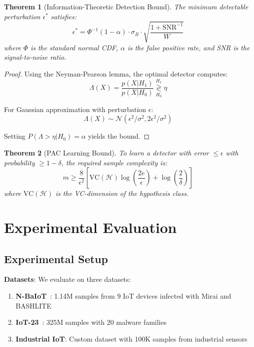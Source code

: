 \documentclass[10pt,conference]{IEEEtran}
\newtheorem{theorem}{Theorem}
\begin{document}
\begin{theorem}[Information-Theoretic Detection Bound]
\label{thm:info_bound}
The minimum detectable perturbation $\epsilon^*$ satisfies:
\begin{equation}
\epsilon^* = \Phi^{-1}(1-\alpha) \cdot \sigma_B \cdot \sqrt{\frac{1 + \text{SNR}^{-1}}{W}}
\end{equation}
where $\Phi$ is the standard normal CDF, $\alpha$ is the false positive rate, and SNR is the signal-to-noise ratio.
\end{theorem}

\begin{proof}
Using the Neyman-Pearson lemma, the optimal detector computes:
\begin{equation}
\Lambda(X) = \frac{p(X|H_1)}{p(X|H_0)} \underset{H_0}{\overset{H_1}{\gtrless}} \eta
\end{equation}

For Gaussian approximation with perturbation $\epsilon$:
\begin{equation}
\Lambda(X) \sim \mathcal{N}(\epsilon^2/\sigma^2, 2\epsilon^2/\sigma^2)
\end{equation}

Setting $P(\Lambda > \eta | H_0) = \alpha$ yields the bound.
\end{proof}

\begin{theorem}[PAC Learning Bound]
\label{thm:pac}
To learn a detector with error $\leq \epsilon$ with probability $\geq 1-\delta$, the required sample complexity is:
\begin{equation}
m \geq \frac{8}{\epsilon^2} \left[\text{VC}(\mathcal{H}) \log\left(\frac{2e}{\epsilon}\right) + \log\left(\frac{2}{\delta}\right)\right]
\end{equation}
where $\text{VC}(\mathcal{H})$ is the VC-dimension of the hypothesis class.
\end{theorem}

\section{Experimental Evaluation}

\subsection{Experimental Setup}

\textbf{Datasets}: We evaluate on three datasets:
\begin{enumerate}
    \item \textbf{N-BaIoT}~\cite{nbaiot}: 1.14M samples from 9 IoT devices infected with Mirai and BASHLITE
    \item \textbf{IoT-23}~\cite{iot23}: 325M samples with 20 malware families
    \item \textbf{Industrial IoT}: Custom dataset with 100K samples from industrial sensors
\end{enumerate}
\end{document}
